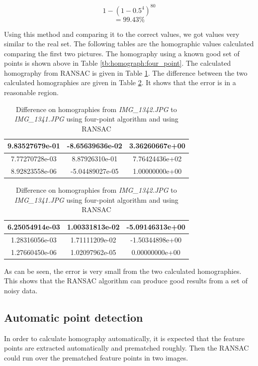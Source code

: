 \documentclass[paper=a4, fontsize=11pt]{scrartcl}
\begin{document}
$$1-(1-0.5^4)^80$$
$$=99.43\%$$

Using this method and comparing it to the correct values, we got values very similar to the real set.  The following tables are the homographic values calculated comparing the first two pictures.
The homography using a known good set of points is shown above in Table \ref{tb:homograph:four_point}.
The calculated homography from RANSAC is given in Table \ref{tb:homograph:ransac}.
The difference between the two calculated homographies are given in Table \ref{tb:homograph:ransac:error}.
It shows that the error is in a reasonable region.

\begin{table}
\caption{Difference on homographies from \emph{IMG\_1342.JPG} to \emph{IMG\_1341.JPG} using four-point algorithm and using RANSAC}
\label{tb:homograph:ransac}
\begin{center}
\begin{tabular}{|c|c|c|}
\hline
9.83527679e-01 & -8.65639636e-02 &  3.36260667e+00\\
\hline
7.77270728e-03 &  8.87926310e-01 &  7.76424436e+02\\
\hline
8.92823558e-06 & -5.04489027e-05 &  1.00000000e+00\\
\hline
\end{tabular}
\end{center}
\end{table}


\begin{table}
\caption{Difference on homographies from \emph{IMG\_1342.JPG} to \emph{IMG\_1341.JPG} using four-point algorithm and using RANSAC}
\label{tb:homograph:ransac:error}
\begin{center}
\begin{tabular}{|c|c|c|}
\hline
6.25054914e-03 &  1.00331813e-02 & -5.09146313e+00\\
\hline
1.28316056e-03 &  1.71111209e-02 & -1.50344898e+00\\
\hline
1.27660450e-06 &  1.02097962e-05 &  0.00000000e+00\\
\hline
\end{tabular}
\end{center}
\end{table}

As can be seen, the error is very small from the two calculated homographies.  This shows that the RANSAC algorithm can produce good results from a set of noisy data.

\subsection{Automatic point detection}
In order to calculate homography automatically, it is expected that the feature points are extracted automatically and prematched roughly.
Then the RANSAC could run over the prematched feature points in two images.
\end{document}

